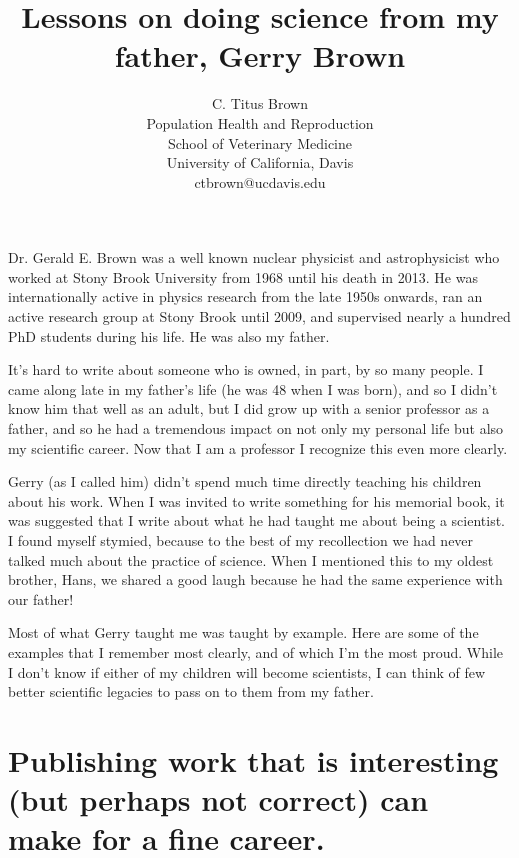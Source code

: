 


\title{Lessons on doing science from my father, Gerry Brown}
\author{C. Titus Brown\\
  Population Health and Reproduction\\
  School of Veterinary Medicine\\
  University of California, Davis\\
  ctbrown@ucdavis.edu}
\maketitle



Dr. Gerald E. Brown was a well known nuclear physicist and
astrophysicist who worked at Stony Brook University from 1968 until
his death in 2013. He was internationally active in physics research
from the late 1950s onwards, ran an active research group at Stony
Brook until 2009, and supervised nearly a hundred PhD students during
his life. He was also my father.

It's hard to write about someone who is owned, in part, by so many
people. I came along late in my father's life (he was 48 when I was
born), and so I didn't know him that well as an adult, but I did grow
up with a senior professor as a father, and so he had a tremendous
impact on not only my personal life but also my scientific career. Now
that I am a professor I recognize this even more clearly.

Gerry (as I called him) didn't spend much time directly teaching his
children about his work.  When I was invited to write something for
his memorial book, it was suggested that I write about what he had
taught me about being a scientist. I found myself stymied, because to
the best of my recollection we had never talked much about the
practice of science. When I mentioned this to my oldest brother, Hans,
we shared a good laugh because he had the same experience with our
father!

Most of what Gerry taught me was taught by example. Here are
some of the examples that I remember most clearly, and of which I'm
the most proud. While I don't know if either of my children will
become scientists, I can think of few better scientific legacies to
pass on to them from my father.

\section*{Publishing work that is interesting (but perhaps not correct) can make
for a fine career.}

